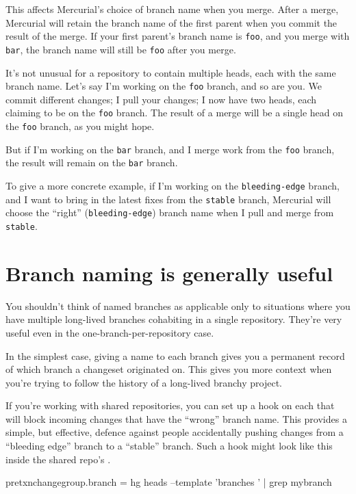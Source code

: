 This affects Mercurial's choice of branch name when you merge.  After
a merge, Mercurial will retain the branch name of the first parent
when you commit the result of the merge.  If your first parent's
branch name is \texttt{foo}, and you merge with \texttt{bar}, the
branch name will still be \texttt{foo} after you merge.

It's not unusual for a repository to contain multiple heads, each with
the same branch name.  Let's say I'm working on the \texttt{foo}
branch, and so are you.  We commit different changes; I pull your
changes; I now have two heads, each claiming to be on the \texttt{foo}
branch.  The result of a merge will be a single head on the
\texttt{foo} branch, as you might hope.

But if I'm working on the \texttt{bar} branch, and I merge work from
the \texttt{foo} branch, the result will remain on the \texttt{bar}
branch.

To give a more concrete example, if I'm working on the
\texttt{bleeding-edge} branch, and I want to bring in the latest fixes
from the \texttt{stable} branch, Mercurial will choose the ``right''
(\texttt{bleeding-edge}) branch name when I pull and merge from
\texttt{stable}.

\section{Branch naming is generally useful}

You shouldn't think of named branches as applicable only to situations
where you have multiple long-lived branches cohabiting in a single
repository.  They're very useful even in the one-branch-per-repository
case.  

In the simplest case, giving a name to each branch gives you a
permanent record of which branch a changeset originated on.  This
gives you more context when you're trying to follow the history of a
long-lived branchy project.

If you're working with shared repositories, you can set up a
 hook on each that will block incoming changes
that have the ``wrong'' branch name.  This provides a simple, but
effective, defence against people accidentally pushing changes from a
``bleeding edge'' branch to a ``stable'' branch.  Such a hook might
look like this inside the shared repo's \hgrc.
\begin{codesample2}
  [hooks]
  pretxnchangegroup.branch = hg heads --template '{branches} ' | grep mybranch
\end{codesample2}

